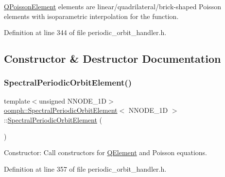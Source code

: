 \hyperlink{classoomph_1_1QPoissonElement}{Q\+Poisson\+Element} elements are linear/quadrilateral/brick-\/shaped Poisson elements with isoparametric interpolation for the function. 

Definition at line 344 of file periodic\+\_\+orbit\+\_\+handler.\+h.



\subsection{Constructor \& Destructor Documentation}
\mbox{\label{classoomph_1_1SpectralPeriodicOrbitElement_ae1eefbd43491bf3437a81c8096dd9fb1}} 
\subsubsection{\texorpdfstring{Spectral\+Periodic\+Orbit\+Element()}{SpectralPeriodicOrbitElement()}\hspace{0.1cm}{\footnotesize\ttfamily [1/2]}}
{\footnotesize\ttfamily template$<$unsigned N\+N\+O\+D\+E\+\_\+1D$>$ \\
\hyperlink{classoomph_1_1SpectralPeriodicOrbitElement}{oomph\+::\+Spectral\+Periodic\+Orbit\+Element}$<$ N\+N\+O\+D\+E\+\_\+1D $>$\+::\hyperlink{classoomph_1_1SpectralPeriodicOrbitElement}{Spectral\+Periodic\+Orbit\+Element} (\begin{DoxyParamCaption}{ }\end{DoxyParamCaption})\hspace{0.3cm}{\ttfamily [inline]}}



Constructor\+: Call constructors for \hyperlink{classoomph_1_1QElement}{Q\+Element} and Poisson equations. 



Definition at line 357 of file periodic\+\_\+orbit\+\_\+handler.\+h.

\mbox{\label{classoomph_1_1SpectralPeriodicOrbitElement_ab700f3cb2925783af85c42080be87554}} 
